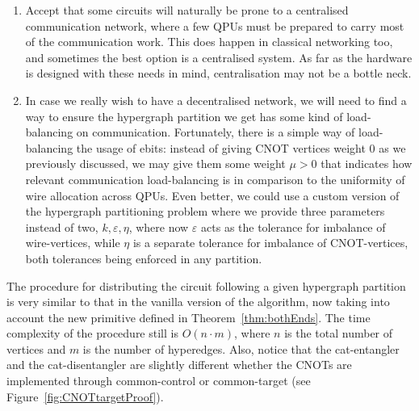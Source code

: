 
\begin{enumerate}
\item Accept that some circuits will naturally be prone to a centralised communication network, where a few QPUs must be prepared to carry most of the communication work. This does happen in classical networking too, and sometimes the best option is a centralised system. As far as the hardware is designed with these needs in mind, centralisation may not be a bottle neck. 

\item In case we really wish to have a decentralised network, we will need to find a way to ensure the hypergraph partition we get has some kind of load-balancing on communication. Fortunately, there is a simple way of load-balancing the usage of ebits: instead of giving CNOT vertices weight \(0\) as we previously discussed, we may give them some weight \(\mu > 0\) that indicates how relevant communication load-balancing is in comparison to the uniformity of wire allocation across QPUs. Even better, we could use a custom version of the hypergraph partitioning problem where we provide three parameters instead of two, \(k,\varepsilon,\eta\), where now \(\varepsilon\) acts as the tolerance for imbalance of wire-vertices, while \(\eta\) is a separate tolerance for imbalance of CNOT-vertices, both tolerances being enforced in any partition.
\end{enumerate}


The procedure for distributing the circuit following a given hypergraph partition is very similar to that in the vanilla version of the algorithm, now taking into account the new primitive defined in Theorem~\ref{thm:bothEnds}. The time complexity of the procedure still is \(O(n\cdot m)\), where \(n\) is the total number of vertices and \(m\) is the number of hyperedges. Also, notice that the cat-entangler and the cat-disentangler are slightly different whether the CNOTs are implemented through common-control or common-target (see Figure~\ref{fig:CNOTtargetProof}).


